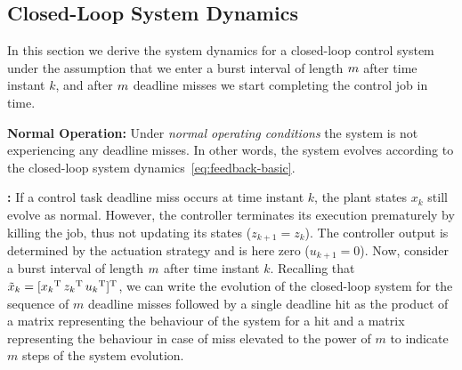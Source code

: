 \subsection{Closed-Loop System Dynamics}%
\label{sec:derivation}
In this section we derive the system dynamics for a closed-loop control system under the assumption that we enter a burst interval of length $m$ after time instant $k$, and after $m$ deadline misses we start completing the control job in time.

\textbf{Normal Operation: }%
Under \emph{normal operating conditions} the system is not experiencing any deadline misses.
In other words, the system evolves according to the closed-loop system dynamics~\eqref{eq:feedback-basic}.

\textbf{\tKZ{}: }%
%
If a control task deadline miss occurs at time instant $k$, the plant states $x_k$ still evolve as normal.
However, the controller terminates its execution prematurely by killing the job, thus not updating its states ($z_{k+1} = z_k$).
The controller output is determined by the actuation strategy and is here zero ($u_{k+1} = 0$).
Now, consider a burst interval of length $m$ after time instant $k$.
Recalling that $\tilde{x}_k = [ {x_k}^{\mathrm{\small{T}}}{}\, {z_k}^{\mathrm{\small{T}}}{}\, {u_k}^{\mathrm{\small{T}}}{} ]^{\mathrm{\small{T}}}$, we can write the evolution of the closed-loop system for the sequence of $m$ deadline misses followed by a single deadline hit as the product of a matrix representing the behaviour of the system for a hit and a matrix representing the behaviour in case of miss elevated to the power of $m$ to indicate $m$ steps of the system evolution.

